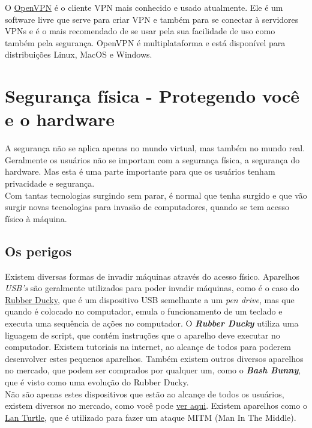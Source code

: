 \documentclass[12pt, letterpaper, DejaVuSansMono:12]{report}
\begin{document}
O \href{https://openvpn.org/}{OpenVPN} é o cliente VPN mais conhecido e usado atualmente. Ele é um software livre que serve para criar VPN e também para se conectar à servidores VPNs e é o mais recomendado de se usar pela sua facilidade de uso como também pela segurança. OpenVPN é multiplataforma e está disponível para distribuições Linux, MacOS e Windows.

\pagebreak

\section{Segurança física - Protegendo você e o hardware}
	A segurança não se aplica apenas no mundo virtual, mas também no mundo real. Geralmente os usuários não se importam com a segurança física, a segurança do hardware. Mas esta é uma parte importante para que os usuários tenham privacidade e segurança.\\

	Com tantas tecnologias surgindo sem parar, é normal que tenha surgido e que vão surgir novas tecnologias para invasão de computadores, quando se tem acesso físico à máquina.
	\subsection{Os perigos}
	Existem diversas formas de invadir máquinas através do acesso físico. Aparelhos \textit{USB's} são geralmente utilizados para poder invadir máquinas, como é o caso do \href{https://pt.wikipedia.org/wiki/Rubber_Ducky}{Rubber Ducky}, que é um dispositivo USB semelhante a um \textit{pen drive}, mas que quando é colocado no computador, emula o funcionamento de um teclado e executa uma sequência de ações no computador. O \textit{\textbf{Rubber Ducky}} utiliza uma liguagem de script, que contém instruções que o aparelho deve executar no computador. Existem tutoriais na internet, ao alcançe de todos para poderem desenvolver estes pequenos aparelhos. Também existem outros diversos aparelhos no mercado, que podem ser comprados por qualquer um, como o \textit{\textbf{Bash Bunny}}, que é visto como uma evolução do Rubber Ducky.\\

	Não são apenas estes dispositivos que estão ao alcançe de todos os usuários, existem diversos no mercado, como você pode \href{https://hakshop.com/}{ver aqui}. Existem aparelhos como o \href{https://hakshop.com/products/lan-turtle}{Lan Turtle}, que é utilizado para fazer um ataque MITM (Man In The Middle).\\
\end{document}
